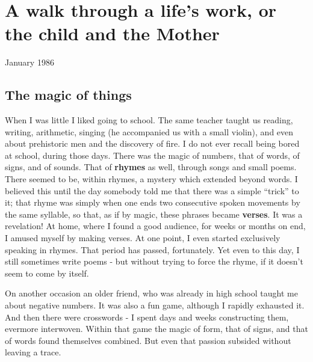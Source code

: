 \begin{comment}
\documentclass{book}
\usepackage{master}
\newcommand{\rec}{$\text{R\'ecoltes et Semailles}$}
\newcommand{\no}{n$^\circ$}
\hfuzz = 100pt

\setcounter{chapter}{1}
\end{comment}

\chapter{A walk through a life's work, or the child and the Mother}
\label{chapter:2}

January 1986

\section{The magic of things}

When I was little I liked going to school. The same teacher taught us reading,
writing, arithmetic, singing (he accompanied us with a small violin), and even
about prehistoric men and the discovery of fire.
I do not ever recall being bored at school, during those days.
There was the magic of numbers, that of words, of signs, and of sounds.
That of \textbf{rhymes} as well, through songs and small poems. 
There seemed to be, within rhymes, a mystery which extended beyond words.
I believed this until the day somebody told me that there was a simple ``trick'' to it;
that rhyme was simply when one ends
two consecutive spoken movements by the same syllable, so that, as if by magic, these
phrases became \textbf{verses}. It was a revelation! 
At home, where I found a good audience, for weeks or months on end, I amused myself by
making verses. At one point, I even started exclusively speaking in rhymes. 
That period has passed, fortunately. 
Yet even to this day, I still sometimes write poems - but without trying to force the
rhyme, if it doesn't seem to come by itself. 

On another occasion an older friend, who was already in high school taught me about
negative numbers. It was also a fun game, although I rapidly exhausted it. 
And then there were crosswords - I spent days and weeks constructing them, evermore
interwoven. Within that game the magic of form, that of signs, and that of words found
themselves combined. But even that passion subsided without leaving a trace. 

